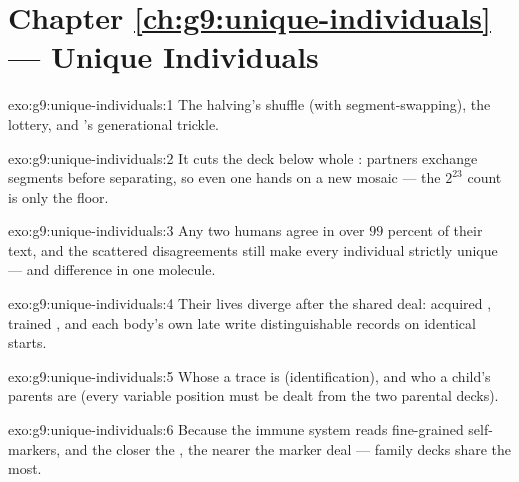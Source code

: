 \section*{Chapter \ref{ch:g9:unique-individuals} --- Unique Individuals}

\begin{solution}{exo:g9:unique-individuals:1}
The halving's shuffle (with segment-swapping), the
 lottery, and 's generational
trickle.
\end{solution}

\begin{solution}{exo:g9:unique-individuals:2}
It cuts the deck below whole : partners exchange
segments before separating, so even one  hands on
a new mosaic --- the $2^{23}$ count is only the floor.
\end{solution}

\begin{solution}{exo:g9:unique-individuals:3}
Any two humans agree in over $99$ percent of their  text,
and the scattered disagreements still make every individual
strictly unique ---  and difference in one molecule.
\end{solution}

\begin{solution}{exo:g9:unique-individuals:4}
Their lives diverge after the shared deal: acquired ,
trained , and each body's own late  write
distinguishable records on identical starts.
\end{solution}

\begin{solution}{exo:g9:unique-individuals:5}
Whose  a trace is (identification), and who a child's
parents are (every variable position must be dealt from the
two parental decks).
\end{solution}

\begin{solution}{exo:g9:unique-individuals:6}
Because the immune system reads fine-grained self-markers,
and the closer the , the nearer the marker deal ---
family decks share the most.
\end{solution}

